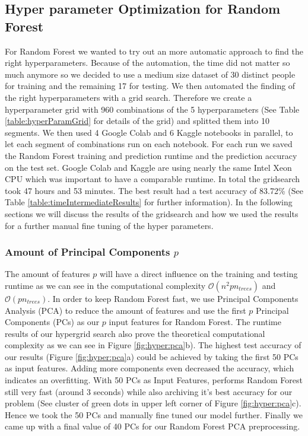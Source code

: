 \documentclass[conference]{IEEEtran}
\begin{document}
\subsection{Hyper parameter Optimization for Random Forest}\label{sec:hyper:rf}
\textcolor{til}{
    For Random Forest we wanted to try out an more automatic approach to find the right hyperparameters. Because of the automation, the time did not matter so much anymore so we decided to use a medium size dataset of 30 distinct people for training and the remaining 17 for testing. We then automated the finding of the right hyperparameters with a grid search. Therefore we create a hyperparameter grid with 960 combinations of the 5 hyperparameters (See Table \ref{table:hyperParamGrid} for details of the grid) and splitted them into 10 segments. We then used 4 Google Colab and 6 Kaggle notebooks in parallel, to let each segment of combinations run on each notebook. For each run we saved the Random Forest training and prediction runtime and the prediction accuracy on the test set. Google Colab and Kaggle are using nearly the same Intel Xeon CPU which was important to have a comparable runtime. In total the gridsearch took 47 hours and 53 minutes. The best result had a test accuracy of 83.72\% (See Table \ref{table:timeIntermediateResults} for further information). In the following sections we will discuss the results of the gridsearch and how we used the results for a further manual fine tuning of the hyper parameters. 
    \subsubsection{Amount of Principal Components $p$}
    The amount of features $p$ will have a direct influence on the training and testing runtime as we can see in the computational complexity $\mathcal{O}(n^2pn_{trees})$ and $\mathcal{O}(pn_{trees})$. In order to keep Random Forest fast, we use Principal Components Analysis (PCA) to reduce the amount of features and use the first $p$ Principal Components (PCs) as our $p$ input features for Random Forest. The runtime results of our hypergrid search also prove the theoretical computational complexity as we can see in Figure \ref{fig:hyper:pca}b). The highest test accuracy of our results (Figure \ref{fig:hyper:pca}a) could be achieved by taking the first 50 PCs as input features. Adding more components even decreased the accuracy, which indicates an overfitting. With 50 PCs as Input Features, performs Random Forest still very fast (around 3 seconds) while also archiving it's best accuracy for our problem (See cluster of green dots in upper left corner of Figure \ref{fig:hyper:pca}c). Hence we took the 50 PCs and manually fine tuned our model further. Finally we came up with a final value of 40 PCs for our Random Forest PCA preprocessing.
}
\end{document}
